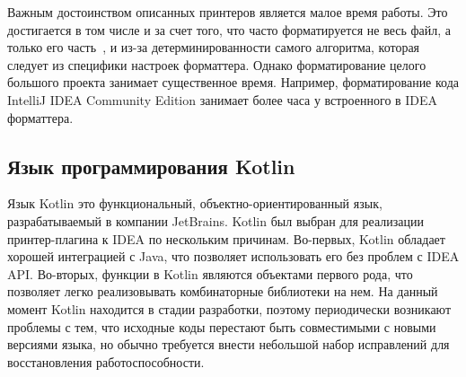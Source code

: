 Важным достоинством описанных принтеров является малое время работы.
Это достигается в том числе и за счет того, что часто форматируется не весь
файл, а только его часть~\cite{eclipse},
и из-за детерминированности самого алгоритма, которая следует из специфики
настроек форматтера.
Однако форматирование целого большого проекта занимает существенное время.
Например, форматирование кода IntelliJ IDEA Community Edition занимает более часа
у встроенного в IDEA форматтера.

\newpage


\subsection{Язык программирования Kotlin}

Язык Kotlin это функциональный, объектно-ориентированный язык,
разрабатываемый в компании JetBrains.
Kotlin был выбран для реализации принтер-плагина к IDEA по нескольким причинам. 
Во-первых, Kotlin обладает хорошей интеграцией с Java, что позволяет
использовать его без проблем с IDEA API. 
Во-вторых, функции в Kotlin являются объектами первого рода, что позволяет
легко реализовывать комбинаторные библиотеки на нем.
На данный момент Kotlin находится в стадии разработки, поэтому
периодически возникают
проблемы с тем, что исходные коды перестают быть совместимыми с новыми
версиями языка,
но обычно требуется внести небольшой набор исправлений для
восстановления работоспособности.
